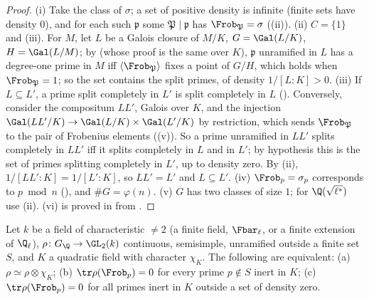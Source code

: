 \begin{proof}
(i) Take the class of $\sigma$; a set of positive density is infinite (finite sets have density $0$), and for each such $\mathfrak p$ some $\mathfrak P\mid\mathfrak p$
has $\Frob_{\mathfrak P}=\sigma$ ((ii)). (ii) $C=\{1\}$ and (iii). For $M$, let $L$ be a Galois closure of $M/K$,
$G=\Gal(L/K)$, $H=\Gal(L/M)$; by  (whose proof is the same over $K$), $\mathfrak p$ unramified in $L$ has a degree-one prime in $M$ iff
$\langle\Frob_{\mathfrak P}\rangle$ fixes a point of $G/H$, which holds when $\Frob_{\mathfrak P}=1$; so the set contains the split primes, of density $1/[L:K]>0$.
(iii) If $L\subseteq L'$, a prime split completely in $L'$ is split completely in $L$ (). Conversely, consider the compositum $LL'$, Galois
over $K$, and the injection $\Gal(LL'/K)\to\Gal(L/K)\times\Gal(L'/K)$ by restriction, which sends $\Frob_{\mathfrak P}$ to the pair of Frobenius elements
((v)). So a prime unramified in $LL'$ splits completely in $LL'$ iff it splits completely in $L$ and in $L'$; by hypothesis this is
the set of primes splitting completely in $L'$, up to density zero. By (ii), $1/[LL':K]=1/[L':K]$, so $LL'=L'$ and $L\subseteq L'$. (iv) $\Frob_p=\sigma_p$
corresponds to $p\bmod n$ (), and $\#G=\varphi(n)$. (v) $G$ has two classes of size $1$; for $\Q(\sqrt{\ell^*})$ use
(ii). (vi) is proved in  from .
\end{proof}

\begin{proposition}\label{prop:ant:twistdetect}
Let $k$ be a field of characteristic $\ne2$ (a finite field, $\Fbar_\ell$, or a finite extension of $\Q_\ell$), $\rho\colon G_\Q\to\GL_2(k)$ continuous,
semisimple, unramified outside a finite set $S$, and $K$ a quadratic field with character $\chi_K$. The following are equivalent:
(a) $\rho\simeq\rho\otimes\chi_K$; (b) $\tr\rho(\Frob_p)=0$ for every prime $p\notin S$ inert in $K$; (c) $\tr\rho(\Frob_p)=0$ for all primes inert in $K$
outside a set of density zero.
\end{proposition}


